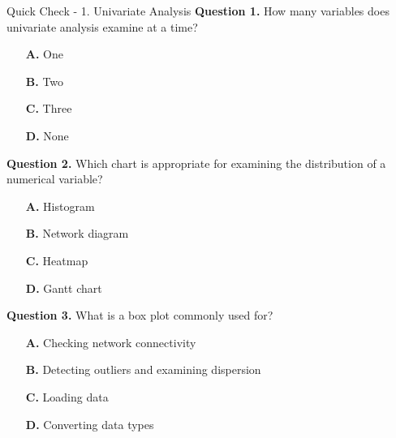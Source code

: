 \documentclass[aspectratio=169,11pt]{beamer}
\begin{document}
\begin{frame}[allowframebreaks]{Quick Check - 1. Univariate Analysis}
\footnotesize
\textbf{Question 1.} How many variables does univariate analysis examine at a time?\par\medskip
\begin{itemize}
\item[\textbf{A.}] One
\item[\textbf{B.}] Two
\item[\textbf{C.}] Three
\item[\textbf{D.}] None
\end{itemize}
\textbf{Question 2.} Which chart is appropriate for examining the distribution of a numerical variable?\par\medskip
\begin{itemize}
\item[\textbf{A.}] Histogram
\item[\textbf{B.}] Network diagram
\item[\textbf{C.}] Heatmap
\item[\textbf{D.}] Gantt chart
\end{itemize}
\textbf{Question 3.} What is a box plot commonly used for?\par\medskip
\begin{itemize}
\item[\textbf{A.}] Checking network connectivity
\item[\textbf{B.}] Detecting outliers and examining dispersion
\item[\textbf{C.}] Loading data
\item[\textbf{D.}] Converting data types
\end{itemize}
\end{frame}
\end{document}
